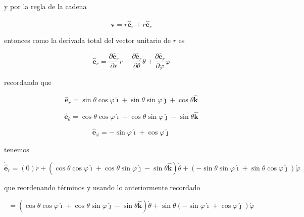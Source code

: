 \documentclass[12pt,a4paper]{article}
\begin{document}
\begin{enumerate}
     y por la regla de la cadena
     
     \begin{equation*}
         \mathbf{v} = \dot{r} \hat{\mathbf{e}}_r + r \dot{\hat{\mathbf{e}}}_r
     \end{equation*}
     
     entonces como la derivada total del vector unitario de $r$ es
     
     \begin{equation*}
         \dot{\hat{\mathbf{e}}}_r = \frac{\partial \hat{\mathbf{e}}_r}{\partial r} \dot{r} + \frac{\partial \hat{\mathbf{e}}_r}{\partial \theta} \dot{\theta} + \frac{\partial \hat{\mathbf{e}}_r}{\partial \varphi} \dot{\varphi}
     \end{equation*}
     
     recordando que 
     
     \begin{equation*}
         \hat{\mathbf{e}}_r = \sin{\theta} \cos{\varphi} \boldsymbol{\hat{\imath}} + \sin{\theta} \sin{\varphi} \boldsymbol{\hat{\jmath}} + \cos{\theta} \mathbf{\hat{k}}
     \end{equation*}
     
     \begin{equation*}
         \hat{\mathbf{e}}_\theta = \cos{\theta} \cos{\varphi} \boldsymbol{\hat{\imath}} + \cos{\theta} \sin{\varphi} \boldsymbol{\hat{\jmath}} - \sin{\theta} \mathbf{\hat{k}}
     \end{equation*}
     
     \begin{equation*}
         \hat{\mathbf{e}}_\varphi = - \sin{\varphi} \boldsymbol{\hat{\imath}} + \cos{\varphi} \boldsymbol{\hat{\jmath}}
     \end{equation*}
     
     tenemos
     
     \begin{equation*}
         \dot{\hat{\mathbf{e}}}_r = (0) \dot{r} + (\cos{\theta}\cos{\varphi} \boldsymbol{\hat{\imath}} + \cos{\theta} \sin{\varphi} \boldsymbol{\hat{\jmath}} - \sin{\theta} \mathbf{\hat{k}}) \dot{\theta} + (-\sin{\theta} \sin{\varphi} \boldsymbol{\hat{\imath}} + \sin{\theta} \cos{\varphi} \boldsymbol{\hat{\jmath}}) \dot{\varphi}
     \end{equation*}
     
     que reordenando términos y usando lo anteriormente recordado
     
     \begin{equation*}
         = (\cos{\theta}\cos{\varphi} \boldsymbol{\hat{\imath}} + \cos{\theta} \sin{\varphi} \boldsymbol{\hat{\jmath}} - \sin{\theta} \mathbf{\hat{k}}) \dot{\theta} + \sin{\theta} (- \sin{\varphi} \boldsymbol{\hat{\imath}} + \cos{\varphi} \boldsymbol{\hat{\jmath}}) \dot{\varphi}
     \end{equation*}
     

\end{enumerate}
\end{document}
